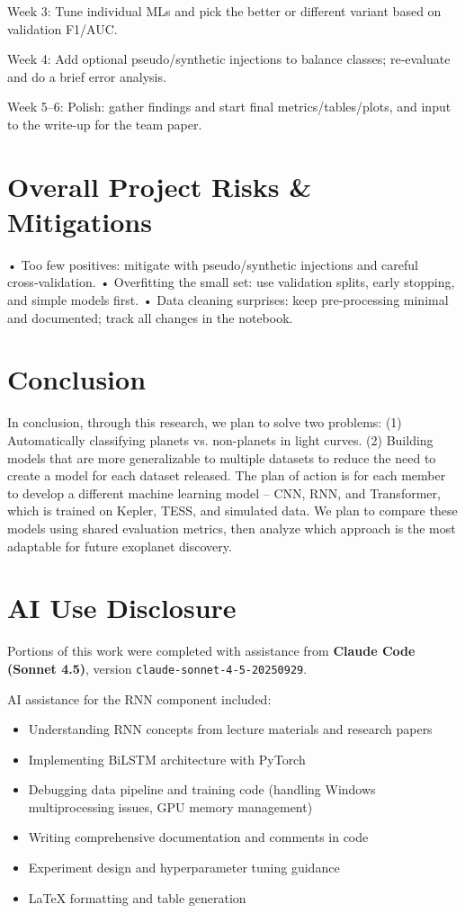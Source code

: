 \documentclass[letterpaper]{article} %
\begin{document}
Week 3: Tune individual MLs and pick the better or different variant based on validation F1/AUC.

Week 4: Add optional pseudo/synthetic injections to balance classes; re‑evaluate and do a brief error analysis.

Week 5–6: Polish: gather findings and start final metrics/tables/plots, and input to the write‑up for the team paper.

\section*{Overall Project Risks \& Mitigations}
• Too few positives: mitigate with pseudo/synthetic injections and careful cross‑validation.
• Overfitting the small set: use validation splits, early stopping, and simple models first.
• Data cleaning surprises: keep pre-processing minimal and documented; track all changes in the notebook.

\section*{Conclusion}
In conclusion, through this research, we plan to solve two problems: (1) Automatically classifying planets vs. non-planets in light curves. (2) Building models that are more generalizable to multiple datasets to reduce the need to create a model for each dataset released. The plan of action is for each member to develop a different machine learning model – CNN, RNN, and Transformer, which is trained on Kepler, TESS, and simulated data. We plan to compare these models using shared evaluation metrics, then analyze which approach is the most adaptable for future exoplanet discovery.

\section*{AI Use Disclosure}

Portions of this work were completed with assistance from \textbf{Claude Code (Sonnet 4.5)}, version \texttt{claude-sonnet-4-5-20250929}.

AI assistance for the RNN component included:
\begin{itemize}
\item Understanding RNN concepts from lecture materials and research papers
\item Implementing BiLSTM architecture with PyTorch
\item Debugging data pipeline and training code (handling Windows multiprocessing issues, GPU memory management)
\item Writing comprehensive documentation and comments in code
\item Experiment design and hyperparameter tuning guidance
\item LaTeX formatting and table generation
\end{itemize}
\end{document}

